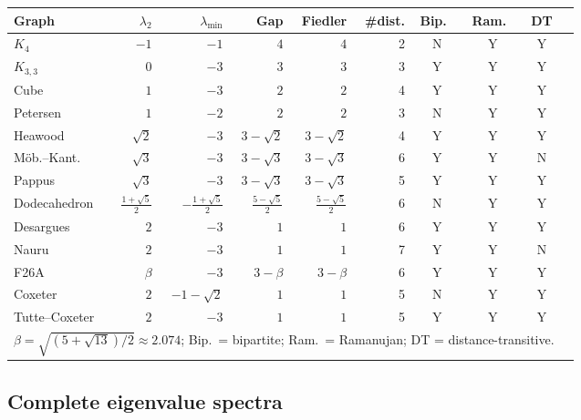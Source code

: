 \documentclass[11pt,a4paper]{article}
\theoremstyle{plain}
\theoremstyle{definition}
\theoremstyle{remark}
\begin{document}
\begin{tcolorbox}[breakable, colback=black!5, colframe=black!5,
  boxrule=0pt, sharp corners]
\centering
{}
\label{tab:spectra-foster}
\small
\begin{tabular}{lrrrrrcccc}
\toprule
Graph & $\lambda_2$ & $\lambda_{\min}$ & Gap & Fiedler & \#dist. & Bip.\ & Ram.\ & DT \\
\midrule
$K_4$             & $-1$        & $-1$       & $4$      & $4$      & 2 & N & Y & Y \\
$K_{3,3}$         & $0$         & $-3$       & $3$      & $3$      & 3 & Y & Y & Y \\
Cube              & $1$         & $-3$       & $2$      & $2$      & 4 & Y & Y & Y \\
Petersen          & $1$         & $-2$       & $2$      & $2$      & 3 & N & Y & Y \\
Heawood           & $\sqrt{2}$  & $-3$       & $3-\sqrt{2}$ & $3-\sqrt{2}$ & 4 & Y & Y & Y \\
M\"{o}b.--Kant. & $\sqrt{3}$  & $-3$       & $3-\sqrt{3}$ & $3-\sqrt{3}$ & 6 & Y & Y & N \\
Pappus            & $\sqrt{3}$  & $-3$       & $3-\sqrt{3}$ & $3-\sqrt{3}$ & 5 & Y & Y & Y \\
Dodecahedron      & $\frac{1+\sqrt{5}}{2}$ & $-\frac{1+\sqrt{5}}{2}$ & $\frac{5-\sqrt{5}}{2}$ & $\frac{5-\sqrt{5}}{2}$ & 6 & N & Y & Y \\
Desargues         & $2$         & $-3$       & $1$      & $1$      & 6 & Y & Y & Y \\
Nauru             & $2$         & $-3$       & $1$      & $1$      & 7 & Y & Y & N \\
F26A              & $\beta$     & $-3$       & $3-\beta$ & $3-\beta$ & 6 & Y & Y & Y \\
Coxeter           & $2$         & $-1-\sqrt{2}$ & $1$  & $1$      & 5 & N & Y & Y \\
Tutte--Coxeter    & $2$         & $-3$       & $1$      & $1$      & 5 & Y & Y & Y \\
\bottomrule
\multicolumn{9}{l}{\small $\beta = \sqrt{(5+\sqrt{13})/2} \approx 2.074$; Bip.\ = bipartite; Ram.\ = Ramanujan; DT = distance-transitive.}
\end{tabular}
\end{tcolorbox}


\subsection{Complete eigenvalue spectra}
\end{document}
